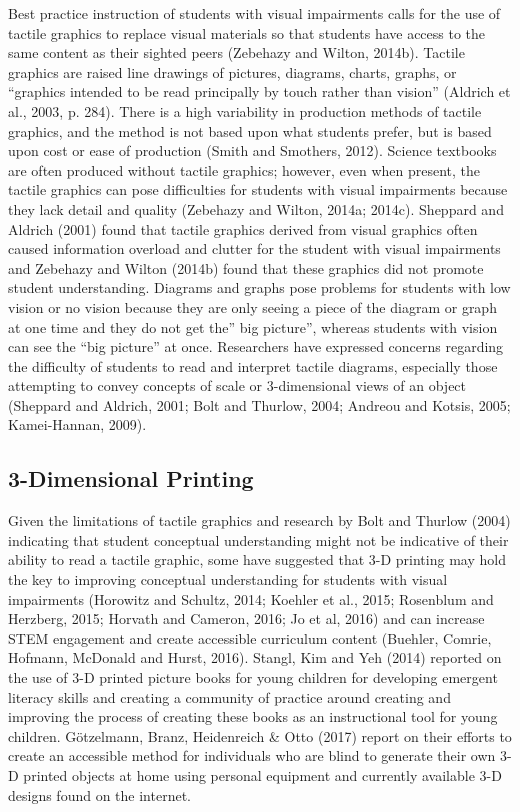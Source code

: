 \documentclass[11.5pt]{sig-alternate} %
\begin{document}
\begin{large}
Best practice instruction of students with visual impairments calls for the use of tactile graphics to replace visual materials so that students have access to the same content as their sighted peers (Zebehazy and Wilton, 2014b).  Tactile graphics are raised line drawings of pictures, diagrams, charts, graphs, or “graphics intended to be read principally by touch rather than vision” (Aldrich et al., 2003, p. 284).  There is a high variability in production methods of tactile graphics, and the method is not based upon what students prefer, but is based upon cost or ease of production (Smith and Smothers, 2012).  Science textbooks are often produced without tactile graphics; however, even when present, the tactile graphics can pose difficulties for students with visual impairments because they lack detail and quality (Zebehazy and Wilton, 2014a; 2014c).  Sheppard and Aldrich (2001) found that tactile graphics derived from visual graphics often caused information overload and clutter for the student with visual impairments and Zebehazy and Wilton (2014b) found that these graphics did not promote student understanding.  Diagrams and graphs pose problems for students with low vision or no vision because they are only seeing a piece of the diagram or graph at one time and they do not get the” big picture”, whereas students with vision can see the “big picture” at once.  Researchers have expressed concerns regarding the difficulty of students to read and interpret tactile diagrams, especially those attempting to convey concepts of scale or 3-dimensional views of an object (Sheppard and Aldrich, 2001; Bolt and Thurlow, 2004; Andreou and Kotsis, 2005; Kamei-Hannan, 2009).  

\subsection*{3-Dimensional Printing}

Given the limitations of tactile graphics and research by Bolt and Thurlow (2004) indicating that student conceptual understanding might not be indicative of their ability to read a tactile graphic, some have suggested that 3-D printing may hold the key to improving conceptual understanding for students with visual impairments (Horowitz and Schultz, 2014; Koehler et al., 2015; Rosenblum and Herzberg, 2015; Horvath and Cameron, 2016; Jo et al, 2016) and can increase STEM engagement and create accessible curriculum content (Buehler, Comrie, Hofmann, McDonald and Hurst, 2016).  Stangl, Kim and Yeh (2014) reported on the use of 3-D printed picture books for young children for developing emergent literacy skills and creating a community of practice around creating and improving the process of creating these books as an instructional tool for young children.  Götzelmann, Branz, Heidenreich \& Otto (2017) report on their efforts to create an accessible method for individuals who are blind to generate their own 3-D printed objects at home using personal equipment and currently available 3-D designs found on the internet. 


\end{large}
\end{document}

